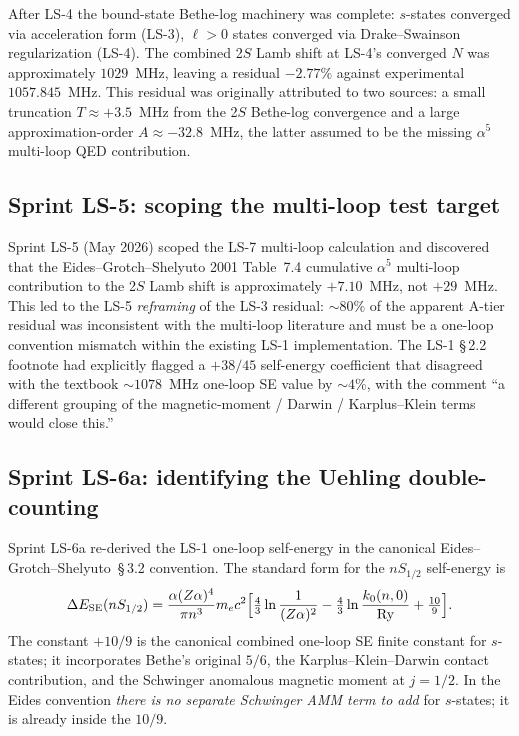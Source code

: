 \documentclass[11pt]{article}
\begin{document}
After LS-4 the bound-state Bethe-log machinery was complete:
$s$-states converged via acceleration form (LS-3), $\ell > 0$ states
converged via Drake--Swainson regularization (LS-4).  The combined
2$S$ Lamb shift at LS-4's converged $N$ was approximately
$1029$~MHz, leaving a residual $-2.77\%$ against experimental
$1057.845$~MHz.  This residual was originally attributed to two
sources: a small truncation $T \approx +3.5$~MHz from the 2$S$
Bethe-log convergence and a large approximation-order
$A \approx -32.8$~MHz, the latter assumed to be the missing $\alpha^5$
multi-loop QED contribution.

\subsection{Sprint LS-5: scoping the multi-loop test target}

Sprint LS-5 (May 2026) scoped the LS-7 multi-loop calculation and
discovered that the Eides--Grotch--Shelyuto 2001 Table~7.4
cumulative $\alpha^5$ multi-loop contribution to the 2$S$ Lamb shift
is approximately $+7.10$~MHz, not $+29$~MHz.  This led to the LS-5
\emph{reframing} of the LS-3 residual: $\sim 80\%$ of the apparent
A-tier residual was inconsistent with the multi-loop literature and
must be a one-loop convention mismatch within the existing LS-1
implementation.  The LS-1 \S\,2.2 footnote had explicitly flagged a
$+38/45$ self-energy coefficient that disagreed with the textbook
$\sim 1078$~MHz one-loop SE value by $\sim 4\%$, with the comment
``a different grouping of the magnetic-moment / Darwin /
Karplus--Klein terms would close this.''

\subsection{Sprint LS-6a: identifying the Uehling double-counting}

Sprint LS-6a re-derived the LS-1 one-loop self-energy in the canonical
Eides--Grotch--Shelyuto~\S\,3.2 convention.  The standard form for
the $nS_{1/2}$ self-energy is
\begin{equation}
\label{eq:eides_se}
\Delta E_\text{SE}(nS_{1/2}) = \frac{\alpha (Z\alpha)^4}{\pi n^3} m_e c^2
\Bigl[\tfrac{4}{3} \ln\frac{1}{(Z\alpha)^2}
- \tfrac{4}{3} \ln\frac{k_0(n, 0)}{\mathrm{Ry}}
+ \tfrac{10}{9}\Bigr].
\end{equation}
The constant $+10/9$ is the canonical combined one-loop SE finite
constant for $s$-states; it incorporates Bethe's original $5/6$, the
Karplus--Klein--Darwin contact contribution, and the Schwinger
anomalous magnetic moment at $j = 1/2$.  In the Eides convention
\emph{there is no separate Schwinger AMM term to add} for $s$-states;
it is already inside the $10/9$.
\end{document}
